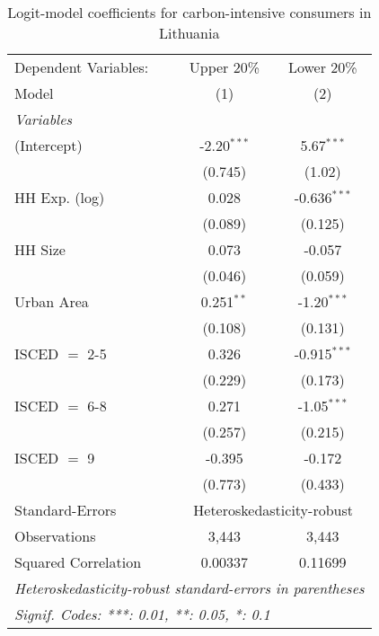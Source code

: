 
\begin{table}[htbp!]
   \centering
   \small
   \begin{adjustbox}{width = 1\textwidth, max height = 0.95\textheight, center}
      \begin{threeparttable}[b]
         \caption{\label{tab:Logit_1_LTU} Logit-model coefficients for carbon-intensive consumers in Lithuania}
         \begin{tabular}{lcc}
            \tabularnewline \midrule \midrule
            Dependent Variables: & Upper 20\%    & Lower 20\%\\   
            Model                & (1)           & (2)\\  
            \midrule
            \emph{Variables}\\
            (Intercept)          & -2.20$^{***}$ & 5.67$^{***}$\\   
                                 & (0.745)       & (1.02)\\   
            HH Exp. (log)        & 0.028         & -0.636$^{***}$\\   
                                 & (0.089)       & (0.125)\\   
            HH Size              & 0.073         & -0.057\\   
                                 & (0.046)       & (0.059)\\   
            Urban Area           & 0.251$^{**}$  & -1.20$^{***}$\\   
                                 & (0.108)       & (0.131)\\   
            ISCED $=$ 2-5        & 0.326         & -0.915$^{***}$\\   
                                 & (0.229)       & (0.173)\\   
            ISCED $=$ 6-8        & 0.271         & -1.05$^{***}$\\   
                                 & (0.257)       & (0.215)\\   
            ISCED $=$ 9          & -0.395        & -0.172\\   
                                 & (0.773)       & (0.433)\\   
            \midrule 
            Standard-Errors & \multicolumn{2}{c}{Heteroskedasticity-robust} \\ 
            Observations         & 3,443         & 3,443\\  
            Squared Correlation  & 0.00337       & 0.11699\\  
            \midrule \midrule
            \multicolumn{3}{l}{\emph{Heteroskedasticity-robust standard-errors in parentheses}}\\
            \multicolumn{3}{l}{\emph{Signif. Codes: ***: 0.01, **: 0.05, *: 0.1}}\\
         \end{tabular}
         

\end{threeparttable}
\end{adjustbox}
\end{table}
